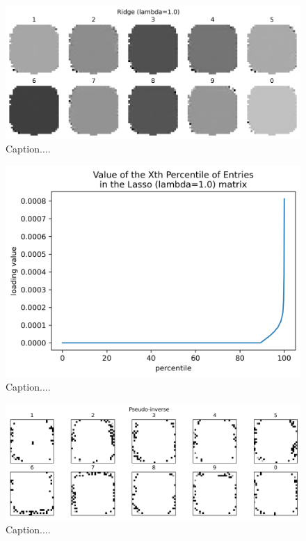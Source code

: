 \documentclass[10pt]{article}
\begin{document}
\begin{figure}[ht]
\centerline{\includegraphics[scale=0.75]{figures/weight_matrix_ridge_no_zeros.png}}
\caption{Caption....}
\label{fig13}
\end{figure}

\begin{figure}[ht]
\centerline{\includegraphics[scale=0.9]{figures/lasso_loading_percentiles-see_uptick_at_90.png}}
\caption{Caption....}
\label{fig14}
\end{figure}

\begin{figure}[ht]
\centerline{\includegraphics[scale=0.75]{figures/weight_matrix_pinv_geq_90th_no_zeros.png}}
\caption{Caption....}
\label{fig15}
\end{figure}
\end{document}
